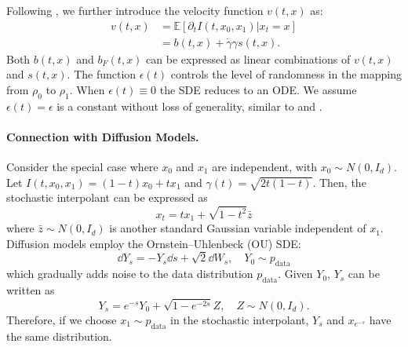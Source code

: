 Following \citet{interpolation}, we further introduce the velocity function $v(t,x)$ as: %
\begin{equation}
    \begin{aligned}
        v(t,x)&=\mathbb{E}[\partial_tI(t,x_0,x_1)|x_t=x]\\
        &=b(t,x)+\dot{\gamma}\gamma s(t,x).
    \end{aligned}
    \label{def:v}
\end{equation}
Both $b(t,x)$ and $b_F(t,x)$ can be expressed as linear combinations of $v(t,x)$ and $s(t,x)$. The function $\epsilon(t)$ controls the level of randomness in the mapping from $\rho_0$ to $\rho_1$. When $\epsilon(t)\equiv0$  the SDE reduces to an ODE. We assume $\epsilon(t)=\epsilon$ is a constant without loss of generality, similar to \citet{interpolation} and \citet{costa2024equijumpproteindynamicssimulation}. %



\paragraph{Connection with Diffusion Models.} 

Consider the special case where $x_0$ and $x_1$ are independent, with $x_0\sim N(0,I_d)$. Let $I(t,x_0,x_1)=(1-t)x_0+tx_1$ and $\gamma(t)=\sqrt{2t(1-t)}$. Then, the stochastic interpolant can be expressed as 
$$x_t=tx_1+\sqrt{1-t^2}\bar{z}$$
where $\bar{z}\sim N(0,I_d)$ is another standard Gaussian variable independent of $x_1$. Diffusion models \cite{song2021scorebased} employ the Ornstein–Uhlenbeck (OU) SDE:
$$\dd Y_s=-Y_s\dd s+\sqrt{2}\dd W_s,\quad Y_0\sim p_{\text{data}}$$
which gradually adds noise to the data distribution $p_{\text{data}}$. Given $Y_0$, $Y_s$ can be written as $$Y_s=e^{-s}Y_0+\sqrt{1-e^{-2s}}Z,\quad Z\sim N(0,I_d).$$
Therefore, if we choose $x_1\sim p_{\text{data}}$ in the stochastic interpolant, $Y_s$ and $x_{e^{-s}}$ have the same distribution.

